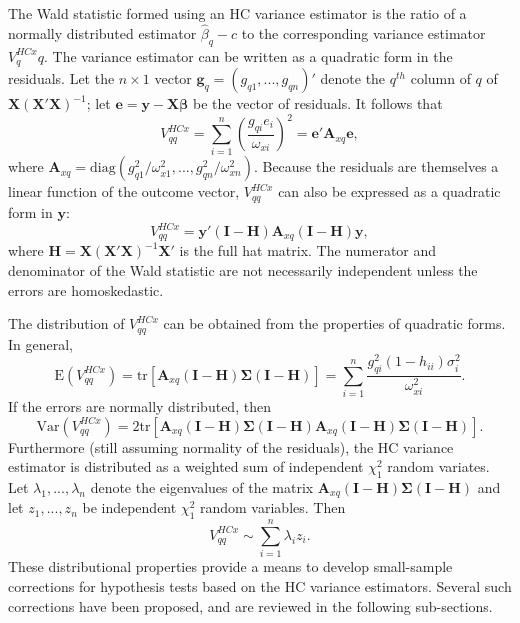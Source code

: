 \documentclass{article}\usepackage[]{graphicx}\usepackage[]{color}
\newcommand{\E}{\text{E}}
\newcommand{\Var}{\text{Var}}
\newcommand{\tr}{\text{tr}}
\newcommand{\diag}{\text{diag}}
\newcommand{\bm}{\mathbf}
\newcommand{\bs}{\boldsymbol}
\begin{document}
The Wald statistic formed using an HC variance estimator is the ratio of a normally distributed estimator $\hat\beta_q - c$ to the corresponding variance estimator $V^{HCx}_qq$. The variance estimator can be written as a quadratic form in the residuals. Let the $n \times 1$ vector $\bm{g}_q = (g_{q1},...,g_{qn})'$ denote the $q^{th}$ column of $q$ of $\bm{X}\left(\bm{X}'\bm{X}\right)^{-1}$; let $\bm{e} = \bm{y} - \bm{X}\bs\beta$ be the vector of residuals. It follows that 
\begin{equation}
V^{HCx}_{qq} = \sum_{i=1}^n \left(\frac{g_{qi} e_i}{\omega_{xi}}\right)^2 = \bm{e}' \bm{A}_{xq} \bm{e},
\end{equation}
where $\bm{A}_{xq} = \diag\left(g_{q1}^2 / \omega_{x1}^2, ..., g_{qn}^2 / \omega_{xn}^2\right)$. Because the residuals are themselves a linear function of the outcome vector, $V^{HCx}_{qq}$ can also be expressed as a quadratic form in $\bm{y}$: 
\[
V^{HCx}_{qq} = \bm{y}'\left(\bm{I} - \bm{H}\right) \bm{A}_{xq} \left(\bm{I} - \bm{H}\right) \bm{y}, \]
where $\bm{H} = \bm{X}\left(\bm{X}'\bm{X}\right)^{-1} \bm{X}'$ is the full hat matrix. The numerator and denominator of the Wald statistic are not necessarily independent unless the errors are homoskedastic. 

The distribution of $V^{HCx}_{qq}$ can be obtained from the properties of quadratic forms. In general, \[
\E\left(V^{HCx}_{qq}\right) = \tr\left[\bm{A}_{xq} \left(\bm{I} - \bm{H}\right)\bs\Sigma\left(\bm{I} - \bm{H}\right) \right] = \sum_{i=1}^n  \frac{g_{qi}^2 (1 - h_{ii})\sigma_i^2}{\omega_{xi}^2}. \]
If the errors are normally distributed, then \[
\Var\left(V^{HCx}_{qq}\right) = 2\tr\left[\bm{A}_{xq} \left(\bm{I} - \bm{H}\right)\bs\Sigma\left(\bm{I} - \bm{H}\right) \bm{A}_{xq} \left(\bm{I} - \bm{H}\right)\bs\Sigma\left(\bm{I} - \bm{H}\right)\right]. \]
Furthermore (still assuming normality of the residuals), the HC variance estimator is distributed as a weighted sum of independent $\chi^2_1$ random variates. Let $\lambda_1,...,\lambda_n$ denote the eigenvalues of the matrix $\bm{A}_{xq} \left(\bm{I} - \bm{H}\right)\bs\Sigma\left(\bm{I} - \bm{H}\right)$ and let $z_1,...,z_n$ be independent $\chi^2_1$ random variables. Then 
\begin{equation}
\label{eq:quadratic_dist}
V^{HCx}_{qq} \sim \sum_{i=1}^n \lambda_i z_i.
\end{equation}
These distributional properties provide a means to develop small-sample corrections for hypothesis tests based on the HC variance estimators. Several such corrections have been proposed, and are reviewed in the following sub-sections. 
\end{document}
